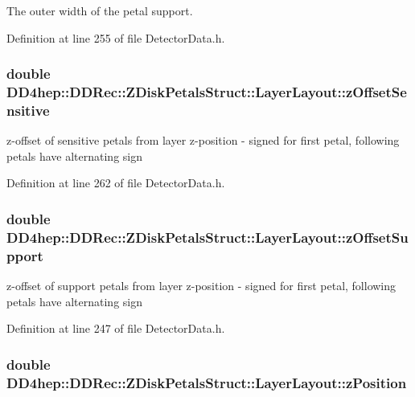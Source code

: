 The outer width of the petal support. 

Definition at line 255 of file DetectorData.h.\hypertarget{struct_d_d4hep_1_1_d_d_rec_1_1_z_disk_petals_struct_1_1_layer_layout_a9ce8e7e2195166045f83358a3915e96f}{
\subsubsection[{zOffsetSensitive}]{\setlength{\rightskip}{0pt plus 5cm}double {\bf DD4hep::DDRec::ZDiskPetalsStruct::LayerLayout::zOffsetSensitive}}}
\label{struct_d_d4hep_1_1_d_d_rec_1_1_z_disk_petals_struct_1_1_layer_layout_a9ce8e7e2195166045f83358a3915e96f}
z-\/offset of sensitive petals from layer z-\/position -\/ signed for first petal, following petals have alternating sign 

Definition at line 262 of file DetectorData.h.\hypertarget{struct_d_d4hep_1_1_d_d_rec_1_1_z_disk_petals_struct_1_1_layer_layout_acce2801e94b24764955762c2a659e96b}{
\subsubsection[{zOffsetSupport}]{\setlength{\rightskip}{0pt plus 5cm}double {\bf DD4hep::DDRec::ZDiskPetalsStruct::LayerLayout::zOffsetSupport}}}
\label{struct_d_d4hep_1_1_d_d_rec_1_1_z_disk_petals_struct_1_1_layer_layout_acce2801e94b24764955762c2a659e96b}
z-\/offset of support petals from layer z-\/position -\/ signed for first petal, following petals have alternating sign 

Definition at line 247 of file DetectorData.h.\hypertarget{struct_d_d4hep_1_1_d_d_rec_1_1_z_disk_petals_struct_1_1_layer_layout_a2b501a3aa1eb000afd0c2b15a3fa3ff0}{
\subsubsection[{zPosition}]{\setlength{\rightskip}{0pt plus 5cm}double {\bf DD4hep::DDRec::ZDiskPetalsStruct::LayerLayout::zPosition}}}
\label{struct_d_d4hep_1_1_d_d_rec_1_1_z_disk_petals_struct_1_1_layer_layout_a2b501a3aa1eb000afd0c2b15a3fa3ff0}



